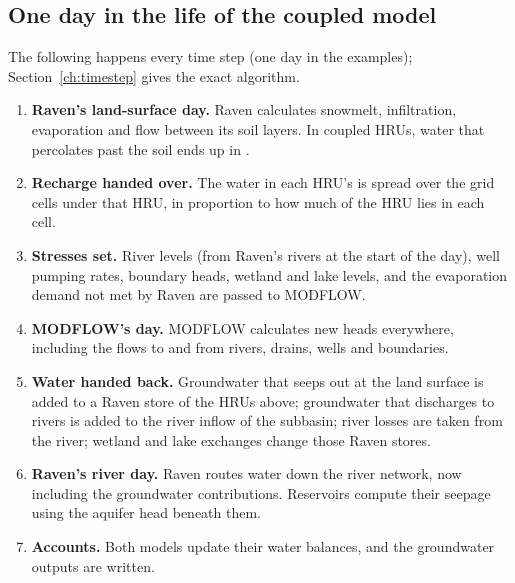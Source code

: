 \subsection{One day in the life of the coupled model}
The following happens every time step (one day in the examples); Section~\ref{ch:timestep} gives the exact algorithm.
\begin{enumerate}
\item \textbf{Raven's land-surface day.} Raven calculates snowmelt, infiltration, evaporation and flow between its soil
layers. In coupled HRUs, water that percolates past the soil ends up in .
\item \textbf{Recharge handed over.} The water in each HRU's  is spread over the grid cells under that
HRU, in proportion to how much of the HRU lies in each cell.
\item \textbf{Stresses set.} River levels (from Raven's rivers at the start of the day), well pumping rates,
boundary heads, wetland and lake levels, and the evaporation demand not met by Raven are passed to MODFLOW.
\item \textbf{MODFLOW's day.} MODFLOW calculates new heads everywhere, including the flows to and from rivers,
drains, wells and boundaries.
\item \textbf{Water handed back.} Groundwater that seeps out at the land surface is added to a Raven store of the HRUs
above; groundwater that discharges to rivers is added to the river inflow of the subbasin; river losses are taken from
the river; wetland and lake exchanges change those Raven stores.
\item \textbf{Raven's river day.} Raven routes water down the river network, now including the groundwater
contributions. Reservoirs compute their seepage using the aquifer head beneath them.
\item \textbf{Accounts.} Both models update their water balances, and the groundwater outputs are written.
\end{enumerate}

